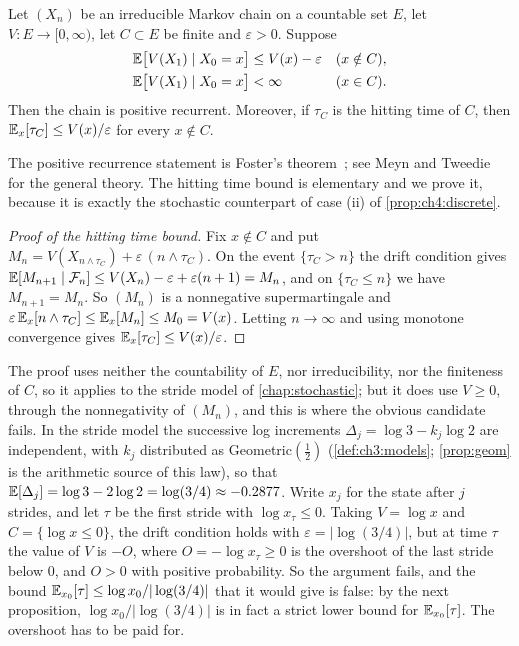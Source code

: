 \begin{theorem}\label{thm:ch4:foster}
Let $(X_n)$ be an irreducible Markov chain on a countable set $E$, let
$V:E\to[0,\infty)$, let $C\subset E$ be finite and $\varepsilon>0$.  Suppose
\begin{align*}
  \mathbb{E}\bigl[V(X_1)\mid X_0=x\bigr]&\le V(x)-\varepsilon &&(x\notin C),\\
  \mathbb{E}\bigl[V(X_1)\mid X_0=x\bigr]&<\infty &&(x\in C).
\end{align*}
Then the chain is positive recurrent.  Moreover, if $\tau_C$ is the hitting
time of $C$, then $\mathbb{E}_x[\tau_C]\le V(x)/\varepsilon$ for every $x\notin C$.
\end{theorem}

The positive recurrence statement is Foster's theorem~\cite{foster1953}; see
Meyn and Tweedie~\cite{meyn1993} for the general theory.  The hitting time
bound is elementary and we prove it, because it is exactly the stochastic
counterpart of case (ii) of \cref{prop:ch4:discrete}.

\begin{proof}[Proof of the hitting time bound]
Fix $x\notin C$ and put $M_n=V(X_{n\wedge\tau_C})+\varepsilon\,(n\wedge\tau_C)$.
On the event $\{\tau_C>n\}$ the drift condition gives
$\mathbb{E}[M_{n+1}\mid\mathcal{F}_n]\le V(X_n)-\varepsilon+\varepsilon(n+1)=M_n$, and on
$\{\tau_C\le n\}$ we have $M_{n+1}=M_n$.  So $(M_n)$ is a nonnegative
supermartingale and $\varepsilon\,\mathbb{E}_x[n\wedge\tau_C]\le\mathbb{E}_x[M_n]\le M_0=V(x)$.
Letting $n\to\infty$ and using monotone convergence gives
$\mathbb{E}_x[\tau_C]\le V(x)/\varepsilon$.
\end{proof}

The proof uses neither the countability of $E$, nor irreducibility, nor the finiteness of $C$, so it applies to the stride model of \cref{chap:stochastic}; but it does use $V\ge0$, through the nonnegativity of $(M_n)$, and this is where the obvious candidate fails. In the stride model the successive log increments $\Delta_j=\log 3-k_j\log 2$ are independent, with $k_j$ distributed as Geometric$(\tfrac12)$ (\cref{def:ch3:models}; \cref{prop:geom} is the arithmetic source of this law), so that $\mathbb{E}[\Delta_j]=\log 3-2\log2=\log(3/4)\approx-0.2877$. Write $x_j$ for the state after $j$ strides, and let $\tau$ be the first stride with $\log x_\tau\le0$. Taking $V=\log x$ and $C=\{\log x\le0\}$, the drift condition holds with $\varepsilon=|\log(3/4)|$, but at time $\tau$ the value of $V$ is $-O$, where $O=-\log x_\tau\ge0$ is the overshoot of the last stride below $0$, and $O>0$ with positive probability. So the argument fails, and the bound $\mathbb{E}_{x_0}[\tau]\le\log x_0/|\log(3/4)|$ that it would give is false: by the next proposition, $\log x_0/|\log(3/4)|$ is in fact a strict lower bound for $\mathbb{E}_{x_0}[\tau]$. The overshoot has to be paid for.

